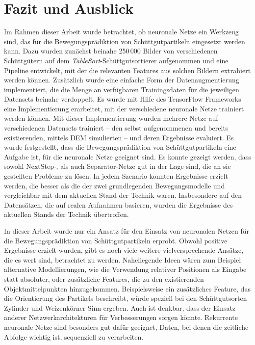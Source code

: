 \chapter{Fazit und Ausblick}
\label{cap:fazit}

Im Rahmen dieser Arbeit wurde betrachtet, ob neuronale Netze ein Werkzeug sind, das für die Bewegungsprädiktion von Schüttgutpartikeln eingesetzt werden kann.
Dazu wurden zunächst beinahe 250\,000 Bilder von verschiedenen Schüttgütern auf dem \textit{TableSort}-Schüttgutsortierer aufgenommen 
und eine Pipeline entwickelt, mit der die relevanten Features aus solchen Bildern extrahiert werden können.
Zusätzlich wurde eine einfache Form der Datenaugmentierung implementiert, die die Menge an verfügbaren Trainingsdaten für die jeweiligen Datensets beinahe verdoppelt.
Es wurde mit Hilfe des TensorFlow Frameworks eine Implementierung erarbeitet, mit der verschiedene neuronale Netze trainiert werden können.
Mit dieser Implementierung wurden mehrere Netze auf verschiedenen Datensets trainiert -- den selbst aufgenommenen und bereits existierenden, mittels DEM simulierten -- und deren Ergebnisse evaluiert.
Es wurde festgestellt, dass die Bewegungsprädiktion von Schüttgutpartikeln eine Aufgabe ist, für die neuronale Netze geeignet sind.
Es konnte gezeigt werden, dass sowohl NextStep-, als auch Separator-Netze gut in der Lage sind, die an sie gestellten Probleme zu lösen.
In jedem Szenario konnten Ergebnisse erzielt werden, die besser als die der zwei grundlegenden Bewegungsmodelle
und vergleichbar mit dem aktuellen Stand der Technik waren.
Insbesondere auf den Datensätzen, die auf realen Aufnahmen basieren, wurden die Ergebnisse des aktuellen Stands der Technik übertroffen.





In dieser Arbeit wurde nur ein Ansatz für den Einsatz von neuronalen Netzen für die Bewegungsprädiktion von Schüttgutpartikeln erprobt.
Obwohl positive Ergebnisse erzielt wurden, gibt es noch viele weitere vielversprechende Ansätze, die es wert sind, betrachtet zu werden.
Naheliegende Ideen wären zum Beispiel alternative Modellierungen, wie die Verwendung relativer Positionen als Eingabe statt absoluter, 
oder zusätzliche Features, die zu den existierenden Objektmittelpunkten hinzugekommen.
Beispielsweise ein zusätzliches Feature, das die Orientierung des Partikels beschreibt, würde speziell bei den Schüttgutsorten Zylinder und Weizenkörner Sinn ergeben.
Auch ist denkbar, dass der Einsatz anderer Netzwerkarchitekturen für Verbesserungen sorgen könnte. 
Rekurrente neuronale Netze sind besonders gut dafür geeignet, Daten, bei denen die zeitliche Abfolge wichtig ist, sequenziell zu verarbeiten.


